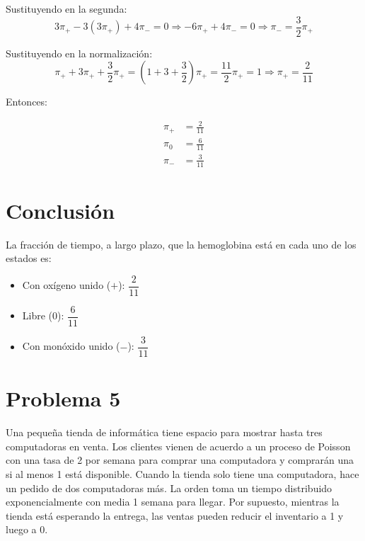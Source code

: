 \documentclass[10pt]{article}
\begin{document}
Sustituyendo en la segunda:
\begin{equation*}
3\pi_+ - 3(3\pi_+) + 4\pi_- = 0 \Rightarrow -6\pi_+ + 4\pi_- = 0 \Rightarrow \pi_- = \frac{3}{2} \pi_+
\end{equation*}

Sustituyendo en la normalización:
\begin{equation*}
\pi_+ + 3\pi_+ + \frac{3}{2}\pi_+ = \left(1 + 3 + \frac{3}{2}\right) \pi_+ = \frac{11}{2} \pi_+ = 1 \Rightarrow \pi_+ = \frac{2}{11}
\end{equation*}

Entonces:

\begin{equation*}
\boxed{
\begin{aligned}
\pi_+ &= \frac{2}{11} \\
\pi_0 &= \frac{6}{11} \\
\pi_- &= \frac{3}{11}
\end{aligned}
}
\end{equation*}

\section*{Conclusión}

La fracción de tiempo, a largo plazo, que la hemoglobina está en cada uno de los estados es:

\begin{itemize}
    \item Con oxígeno unido ($+$): $\boxed{\dfrac{2}{11}}$
    \item Libre ($0$): $\boxed{\dfrac{6}{11}}$
    \item Con monóxido unido ($-$): $\boxed{\dfrac{3}{11}}$
\end{itemize}

\section*{Problema 5}

Una pequeña tienda de informática tiene espacio para mostrar hasta tres computadoras en venta. Los clientes vienen de acuerdo a un proceso de Poisson con una tasa de 2 por semana para comprar una computadora y comprarán una si al menos 1 está disponible. Cuando la tienda solo tiene una computadora, hace un pedido de dos computadoras más. La orden toma un tiempo distribuido exponencialmente con media 1 semana para llegar. Por supuesto, mientras la tienda está esperando la entrega, las ventas pueden reducir el inventario a 1 y luego a 0.
\end{document}
